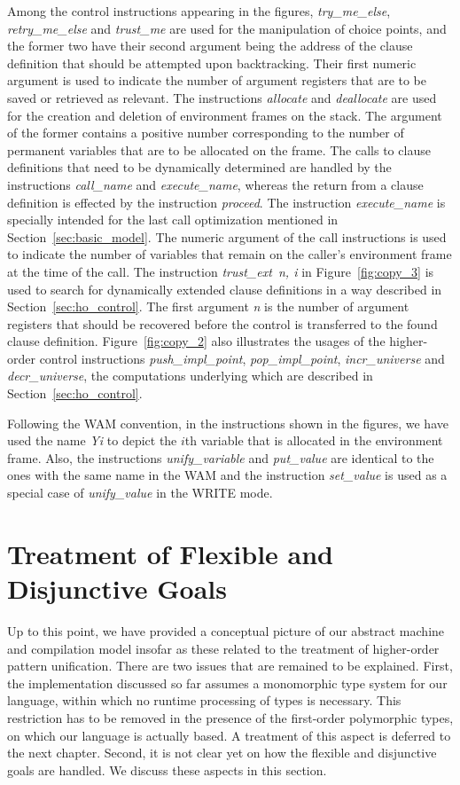 Among the control instructions appearing in the figures,  {\it try\_me\_else},
{\it retry\_me\_else} and {\it trust\_me} are used for the manipulation
of choice points, and the former two have their second argument being
the address of the clause definition that should be attempted upon
backtracking.
Their first numeric argument is used to indicate the number of argument
registers that are to be saved or retrieved as relevant.
The instructions {\it allocate} and {\it deallocate} are used for the
creation and deletion of environment frames on the stack. The argument
of the former contains a positive number corresponding to the number of
permanent variables that are to be allocated on the frame.
The calls to clause definitions that need to be dynamically determined
are handled by the instructions
{\it call\_name} and {\it execute\_name}, whereas the return from a
clause definition is effected by the instruction
{\it proceed}. The instruction
{\it execute\_name} is specially intended for the last call optimization
mentioned
in Section~\ref{sec:basic_model}. The numeric argument of the call instructions
is used to indicate the number of variables that remain on the
caller's environment frame at the time of the call.
The instruction {\it trust\_ext\ n, i} in Figure~\ref{fig:copy_3} is used
to search for dynamically extended clause definitions in a way described in
Section~\ref{sec:ho_control}.
The first argument
{\it n} is the number of argument registers that should be recovered
before the control is transferred to the found clause definition.
Figure~\ref{fig:copy_2} also illustrates the usages of the higher-order
control instructions {\it push\_impl\_point}, {\it pop\_impl\_point},
{\it incr\_universe} and {\it decr\_universe},
the computations underlying which are described in
Section~\ref{sec:ho_control}.

Following the WAM convention, in the instructions shown in the
figures, we have used the name {\it Yi} to depict the $i$th variable
that is allocated in the environment frame. Also, the instructions
{\it unify\_variable} and {\it put\_value} are identical to the ones
with the same name in the WAM and the instruction {\it set\_value}
is used as a special case of {\it unify\_value} in the WRITE mode.

\section{Treatment of Flexible and Disjunctive Goals}\label{sec:misc}
Up to this point, we have provided a conceptual picture of our
abstract machine and compilation model insofar as these related to
the treatment of higher-order pattern unification. There are two
issues that are remained to be explained. First, the implementation
discussed so far assumes a monomorphic type system for our language,
within which no runtime processing of types is necessary. This
restriction has to be removed in the presence of the first-order
polymorphic types, on which our language is actually based. A
treatment of this aspect is deferred to the next chapter. Second, it
is not clear yet on how the flexible and disjunctive goals are
handled. We discuss these aspects in this section.

